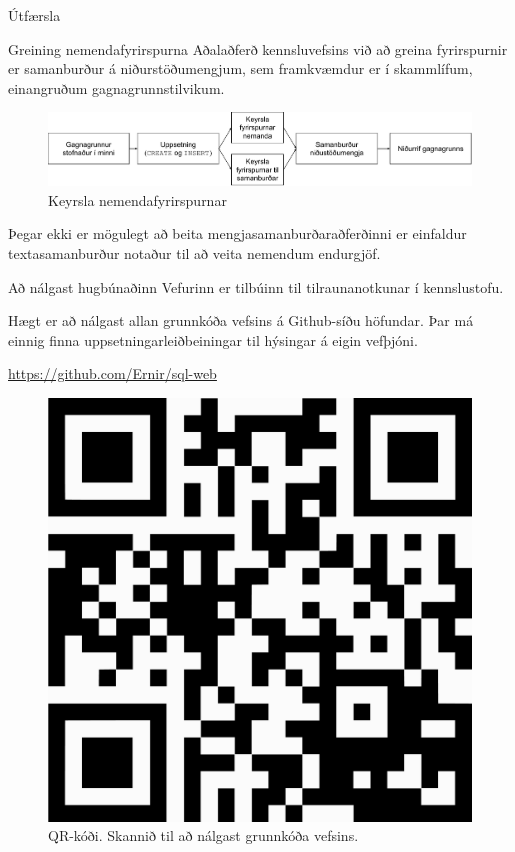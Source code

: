 \documentclass[final]{beamer}
\begin{document}
\begin{frame}
\begin{tcolorbox}[standard jigsaw, height=97cm, colframe=orange, opacityback=0, sharp corners=all]
\begin{columns}[t]
\begin{column}{.47\linewidth}
\begin{block}{Útfærsla}
\begin{subblock}{Greining nemendafyrirspurna}
        Aðalaðferð kennsluvefsins við að greina fyrirspurnir er samanburður á niðurstöðumengjum, sem framkvæmdur er í skammlífum, einangruðum gagnagrunnstilvikum.

        \begin{figure}
            \caption{Keyrsla nemendafyrirspurnar}
            \begin{center}
            \includegraphics[width=\linewidth]{keyrsla-fyrirspurnar-larett}
        \end{center}
        \end{figure}

        Þegar ekki er mögulegt að beita mengjasamanburðaraðferðinni er einfaldur textasamanburður notaður til að veita nemendum endurgjöf.
    \end{subblock}
\end{block}

\begin{block}{Að nálgast hugbúnaðinn}
    Vefurinn er tilbúinn til tilraunanotkunar í kennslustofu.

    Hægt er að nálgast allan grunnkóða vefsins á Github-síðu höfundar. Þar má einnig finna uppsetningarleiðbeiningar til hýsingar á eigin vefþjóni.

    \url{https://github.com/Ernir/sql-web}
    
    \begin{center}
        \begin{figure}
            \caption{QR-kóði. Skannið til að nálgast grunnkóða vefsins.}
            \includegraphics[width=0.25\linewidth]{qr-code}
        \end{figure}
    \end{center}
\end{block}

\end{column}

\end{columns}
\end{tcolorbox}
\end{frame}
\end{document}
